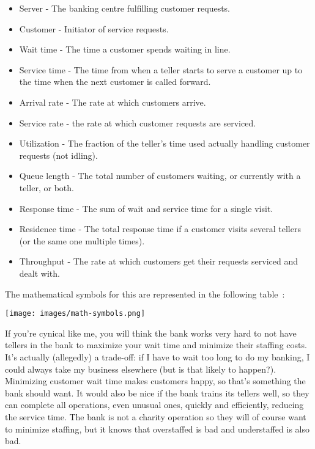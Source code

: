 \begin{itemize}
	\item Server - The banking centre fulfilling customer requests.
	\item Customer - Initiator of service requests.
	\item Wait time - The time a customer spends waiting in line.
	\item Service time - The time from when a teller starts to serve a customer up to the time when the next customer is called forward.
	\item Arrival rate - The rate at which customers arrive.
	\item Service rate - the rate at which customer requests are serviced.
	\item Utilization - The fraction of the teller's time used actually handling customer requests (not idling).
	\item Queue length - The total number of customers waiting, or currently with a teller, or both.
	\item Response time - The sum of wait and service time for a single visit.
	\item Residence time - The total response time if a customer visits several tellers (or the same one multiple times).
	\item Throughput - The rate at which customers get their requests serviced and dealt with.
\end{itemize}

The mathematical symbols for this are represented in the following table~\cite{swps}:


\begin{center}
	\texttt{[image: images/math-symbols.png]}
\end{center}

If you're cynical like me, you will think the bank works very hard to not have tellers in the bank to maximize your wait time and minimize their staffing costs. It's actually (allegedly) a trade-off: if I have to wait too long to do my banking, I could always take my business elsewhere (but is that likely to happen?). Minimizing customer wait time makes customers happy, so that's something the bank should want. It would also be nice if the bank trains its tellers well, so they can complete all operations, even unusual ones, quickly and efficiently, reducing the service time. The bank is not a charity operation so they will of course want to minimize staffing, but it knows that overstaffed is bad and understaffed is also bad. 

